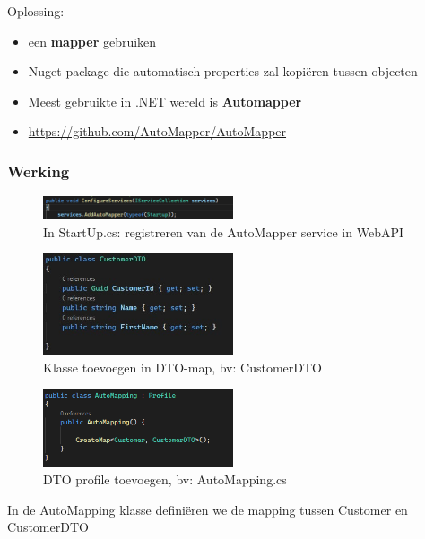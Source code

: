 \documentclass{article}
\begin{document}
Oplossing:

\begin{itemize}
    \item een \textbf{mapper} gebruiken
    \item Nuget package die automatisch properties zal kopiëren tussen objecten
    \item Meest gebruikte in .NET wereld is \textbf{Automapper}
    \item \url{https://github.com/AutoMapper/AutoMapper}
\end{itemize}

\subsubsection{Werking}

\begin{figure}[H]
    \centering
    \includegraphics[width=0.5\textwidth]{dto-startup.png}
    \caption{In StartUp.cs: registreren van de AutoMapper service in WebAPI}
\end{figure}

\begin{figure}[H]
    \centering
    \includegraphics[width=0.5\textwidth]{dto-klasse.png}
    \caption{Klasse toevoegen in DTO-map, bv: CustomerDTO}
\end{figure}

\begin{figure}[H]
    \centering
    \includegraphics[width=0.5\textwidth]{dto-profile.png}
    \caption{DTO profile toevoegen, bv: AutoMapping.cs}
\end{figure}

In de AutoMapping klasse definiëren we de mapping tussen Customer en CustomerDTO
\end{document}

